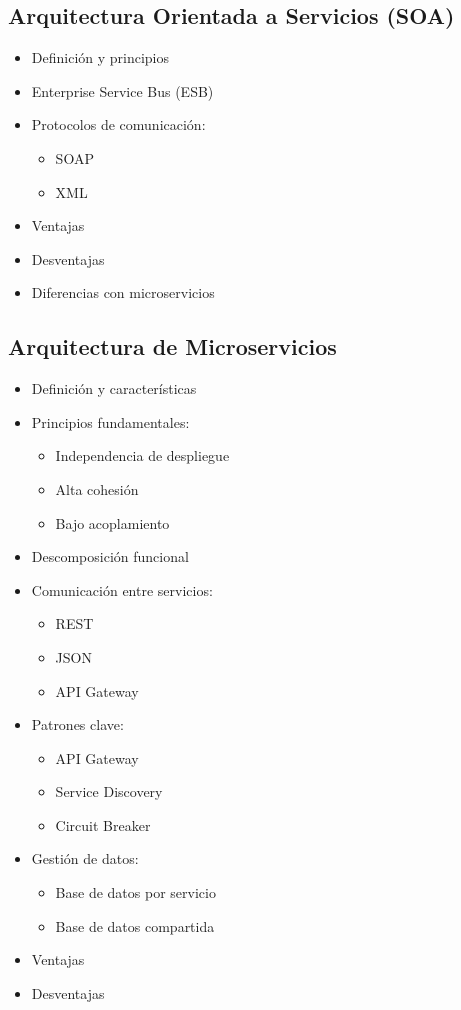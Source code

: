 \subsection{Arquitectura Orientada a Servicios (SOA)}
\begin{itemize}
    \item Definición y principios
    \item Enterprise Service Bus (ESB)
    \item Protocolos de comunicación:
    \begin{itemize}
        \item SOAP
        \item XML
    \end{itemize}
    \item Ventajas
    \item Desventajas
    \item Diferencias con microservicios
\end{itemize}

\subsection{Arquitectura de Microservicios}
\begin{itemize}
    \item Definición y características
    \item Principios fundamentales:
    \begin{itemize}
        \item Independencia de despliegue
        \item Alta cohesión
        \item Bajo acoplamiento
    \end{itemize}
    \item Descomposición funcional
    \item Comunicación entre servicios:
    \begin{itemize}
        \item REST
        \item JSON
        \item API Gateway
    \end{itemize}
    \item Patrones clave:
    \begin{itemize}
        \item API Gateway
        \item Service Discovery
        \item Circuit Breaker
    \end{itemize}
    \item Gestión de datos:
    \begin{itemize}
        \item Base de datos por servicio
        \item Base de datos compartida
    \end{itemize}
    \item Ventajas
    \item Desventajas
\end{itemize}

